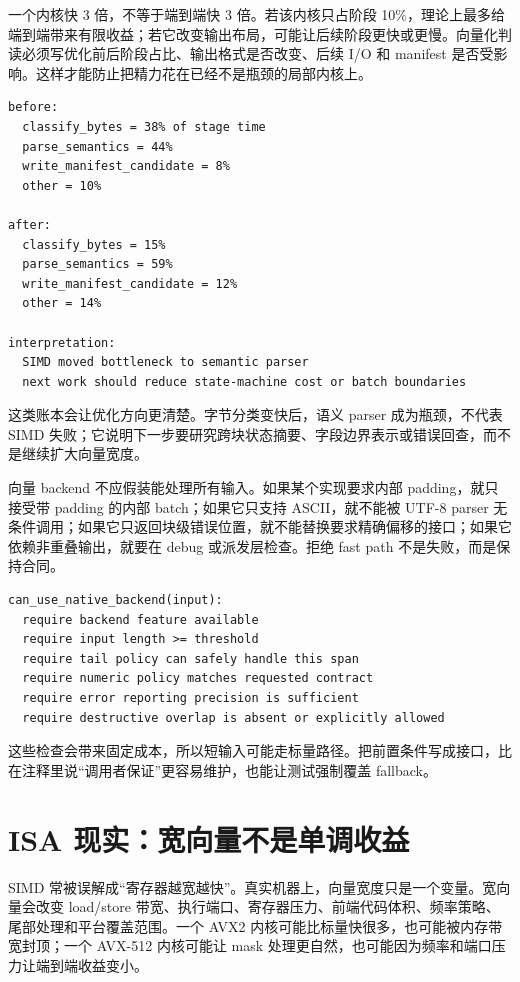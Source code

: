 一个内核快 3 倍，不等于端到端快 3 倍。若该内核只占阶段 10\%，理论上最多给端到端带来有限收益；若它改变输出布局，可能让后续阶段更快或更慢。向量化判读必须写优化前后阶段占比、输出格式是否改变、后续 I/O 和 manifest 是否受影响。这样才能防止把精力花在已经不是瓶颈的局部内核上。

\begin{lstlisting}[numbers=none,caption={向量化收益的端到端账本}]
before:
  classify_bytes = 38% of stage time
  parse_semantics = 44%
  write_manifest_candidate = 8%
  other = 10%

after:
  classify_bytes = 15%
  parse_semantics = 59%
  write_manifest_candidate = 12%
  other = 14%

interpretation:
  SIMD moved bottleneck to semantic parser
  next work should reduce state-machine cost or batch boundaries
\end{lstlisting}

这类账本会让优化方向更清楚。字节分类变快后，语义 parser 成为瓶颈，不代表 SIMD 失败；它说明下一步要研究跨块状态摘要、字段边界表示或错误回查，而不是继续扩大向量宽度。

向量 backend 不应假装能处理所有输入。如果某个实现要求内部 padding，就只接受带 padding 的内部 batch；如果它只支持 ASCII，就不能被 UTF-8 parser 无条件调用；如果它只返回块级错误位置，就不能替换要求精确偏移的接口；如果它依赖非重叠输出，就要在 debug 或派发层检查。拒绝 fast path 不是失败，而是保持合同。

\begin{lstlisting}[numbers=none,caption={向量 fast path 的前置检查}]
can_use_native_backend(input):
  require backend feature available
  require input length >= threshold
  require tail policy can safely handle this span
  require numeric policy matches requested contract
  require error reporting precision is sufficient
  require destructive overlap is absent or explicitly allowed
\end{lstlisting}

这些检查会带来固定成本，所以短输入可能走标量路径。把前置条件写成接口，比在注释里说“调用者保证”更容易维护，也能让测试强制覆盖 fallback。

\section{ISA 现实：宽向量不是单调收益}

SIMD 常被误解成“寄存器越宽越快”。真实机器上，向量宽度只是一个变量。宽向量会改变 load/store 带宽、执行端口、寄存器压力、前端代码体积、频率策略、尾部处理和平台覆盖范围。一个 AVX2 内核可能比标量快很多，也可能被内存带宽封顶；一个 AVX-512 内核可能让 mask 处理更自然，也可能因为频率和端口压力让端到端收益变小。

